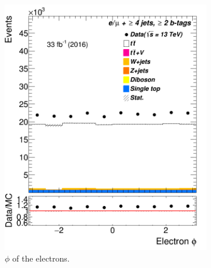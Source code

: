 \begin{figure} [b]
\begin{subfigure}{0.25\textwidth}
 	\includegraphics[width=\linewidth]{ControlPlots_emujets_2016_4incl_2incl/el_phi_emujets_2016.png}
 	\caption{$\phi$ of the electrons.} \label{fig:Sec10}
 \end{subfigure}\hspace*{0.5cm}
 \begin{subfigure}{0.25\textwidth}

\end{subfigure}
\end{figure}

